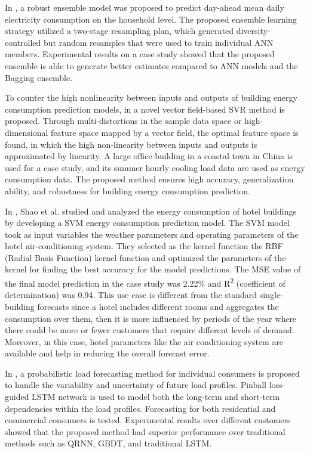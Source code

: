 In \cite{ALOBAIDI2018997}, a robust ensemble model was proposed to predict day-ahead mean daily electricity consumption on the household level.
The proposed ensemble learning strategy utilized a two-stage resampling plan, which generated diversity-controlled but random resamples that were used to train individual ANN members.
Experimental results on a case study showed that the proposed ensemble is able to generate better estimates compared to ANN models and the Bagging ensemble.

To counter the high nonlinearity between inputs and outputs of building energy consumption prediction models, in \cite{ZHONG2019403} a novel vector field-based SVR method is proposed.
Through multi-distortions in the sample data space or high-dimensional feature space mapped by a vector field, the optimal feature space is found, in which the high non-linearity between inputs and outputs is approximated by linearity.
A large office building in a coastal town in China is used for a case study, and its summer hourly cooling load data are used as energy consumption data.
The proposed method ensures high accuracy, generalization ability, and robustness for building energy consumption prediction.

In \cite{SHAO2020102128}, Shao et al. studied and analyzed the energy consumption of hotel buildings by developing a SVM energy consumption prediction model.
The SVM model took as input variables the weather parameters and operating parameters of the hotel air-conditioning system.
They selected as the kernel function the RBF (Radial Basis Function) kernel function and optimized the parameters of the kernel for finding the best accuracy for the model predictions.
The MSE value of the final model prediction in the case study was 2.22\% and R\textsuperscript{2} (coefficient of determination) was 0.94.
This use case is different from the standard single-building forecasts since a hotel includes different rooms and aggregates the consumption over them, then it is more influenced by periods of the year where there could be more or fewer customers that require different levels of demand.
Moreover, in this case, hotel parameters like the air conditioning system are available and help in reducing the overall forecast error.

In \cite{WANG201910}, a probabilistic load forecasting method for individual consumers is proposed to handle the variability and uncertainty of future load profiles.
Pinball loss-guided LSTM network is used to model both the long-term and short-term dependencies within the load profiles.
Forecasting for both residential and commercial consumers is tested.
Experimental results over different customers showed that the proposed method had superior performance over traditional methods such as QRNN, GBDT, and traditional LSTM.

